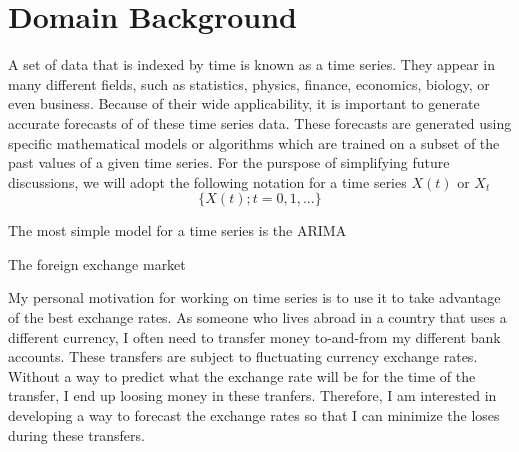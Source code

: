 \documentclass[10pt,a4paper]{article}
\begin{document}

\section{Domain Background}



A set of data that is indexed by time is known as a time series. They appear in many different fields, such as statistics, physics, finance, economics, biology, or even business. Because of their wide applicability, it is important to generate accurate forecasts of of these time series data. These forecasts are generated using specific mathematical models or algorithms which are trained on a subset of the past values of a given time series. For the purspose of simplifying future discussions, we will adopt the following notation for a time series $X(t)$ or $X_t$
\begin{equation}
\lbrace X(t); t=0,1,... \rbrace
\end{equation}

The most simple model for a time series is the ARIMA 


The foreign exchange market 


My personal motivation for working on time series is to use it to take advantage of the best exchange rates. As someone who lives abroad in a country that uses a different currency, I often need to transfer money to-and-from my different bank accounts. These transfers are subject to fluctuating currency exchange rates. Without a way to predict what the exchange rate will be for the time of the transfer, I end up loosing money in these tranfers. Therefore, I am interested in developing a way to forecast the exchange rates so that I can minimize the loses during these transfers.   
\end{document}
